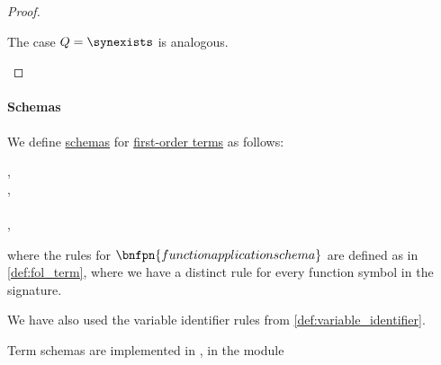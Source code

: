 \begin{proof}
\begin{itemize}
    The case \( Q = \synexists \) is analogous.
  \end{itemize}
\end{proof}

\paragraph{Schemas}

\begin{definition}\label{def:fol_term_schema}\mimprovised
  We define \hyperref[con:schemas_and_instances]{schemas} for \hyperref[def:fol_term]{first-order terms} as follows:
  \begin{bnf*}
     {}, \\
         {}, \\
              { \bnfor {} \bnfor} \\
    ,
  \end{bnf*}
  where the rules for \( \bnfpn{function application schema} \) are defined as in \cref{def:fol_term}, where we have a distinct rule for every function symbol in the signature.

  We have also used the variable identifier rules from \cref{def:variable_identifier}.
\end{definition}
\begin{comments}
  \item Term schemas are implemented in \cite{notebook:code}, in the module
  \begin{CodeRefDisplay}
  \end{CodeRefDisplay}
\end{comments}

